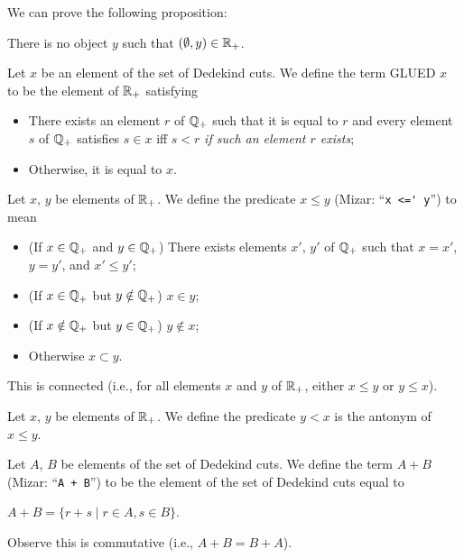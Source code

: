 \documentclass{article}
\begin{document}
We can prove the following proposition:
\begin{thm}
\item\label{arytm2:3} There is no object $y$ such that $(\emptyset,y)\in\mathbb{R}_{+}$.
\end{thm}

\begin{definition}
Let $x$ be an element of the set of Dedekind cuts.
We define the term GLUED $x$ to be the element of $\mathbb{R}_{+}$ satisfying
\begin{defn}
\item \begin{itemize}
\item %
  There exists an element $r$ of $\mathbb{Q}_{+}$ such that it is equal to
  $r$ and every element $s$ of $\mathbb{Q}_{+}$ satisfies $s\in x$ iff $s<r$
  \emph{if such an element $r$ exists};
\item Otherwise, it is equal to $x$.
\end{itemize}
\end{defn}
\end{definition}

\begin{definition}
Let $x$, $y$ be elements of $\mathbb{R}_{+}$.
We define the predicate $x\leq y$ (Mizar: ``\verb#x <=' y#'') to mean
\begin{defn}
\item \begin{itemize}
\item (If $x\in\mathbb{Q}_{+}$ and $y\in\mathbb{Q}_{+}$) There exists elements $x'$, $y'$ of $\mathbb{Q}_{+}$ such that $x=x'$, $y=y'$,
  and $x'\leq y'$;
\item (If $x\in\mathbb{Q}_{+}$ but $y\notin\mathbb{Q}_{+}$) $x\in y$;
\item (If $x\notin\mathbb{Q}_{+}$ but $y\in\mathbb{Q}_{+}$) $y\notin x$;
\item Otherwise $x\subset y$.
\end{itemize}
\end{defn}
This is connected (i.e., for all elements $x$ and $y$ of $\mathbb{R}_{+}$,
either $x\leq y$ or $y\leq x$).
\end{definition}

\begin{notation}
Let $x$, $y$ be elements of $\mathbb{R}_{+}$.
We define the predicate $y<x$ is the antonym of $x\leq y$.
\end{notation}

\begin{definition}
Let $A$, $B$ be elements of the set of Dedekind cuts.
We define the term $A + B$ (Mizar: ``\verb#A + B#'') to be the element
of the set of Dedekind cuts equal to
\begin{defn}
\item $A + B = \{r + s\mid r\in A,s\in B\}$.
\end{defn}
Observe this is commutative (i.e., $A+B=B+A$).
\end{definition}
\end{document}
